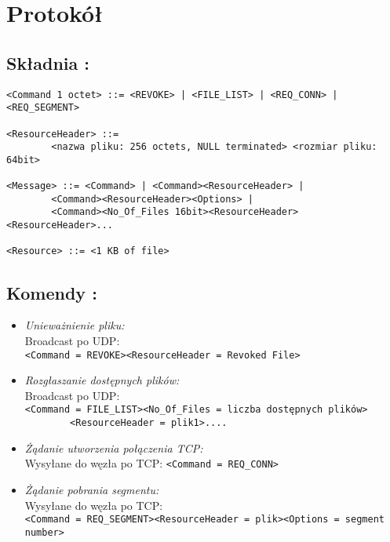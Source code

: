 \documentclass[11pt,oneside]{book}
\newcommand{\+}{\discretionary{\mbox{\scriptsize$\hookleftarrow$}}{}{}}
\begin{document}
\chapter{Protokół}
\section{Składnia :}
\begin{verbatim}
<Command 1 octet> ::= <REVOKE> | <FILE_LIST> | <REQ_CONN> | <REQ_SEGMENT> 

<ResourceHeader> ::= 
        <nazwa pliku: 256 octets, NULL terminated> <rozmiar pliku: 64bit>

<Message> ::= <Command> | <Command><ResourceHeader> | 
        <Command><ResourceHeader><Options> | 
        <Command><No_Of_Files 16bit><ResourceHeader><ResourceHeader>...

<Resource> ::= <1 KB of file>
\end{verbatim}
\section{Komendy :}
\begin{itemize}
\item
\textsl{Unieważnienie pliku:}\\
Broadcast po UDP: \\ \verb|<Command = REVOKE><ResourceHeader = Revoked File>|
\item
\textsl{Rozgłaszanie dostępnych plików:}\\
Broadcast po UDP: \\ \verb|<Command = FILE_LIST><No_Of_Files = liczba dostępnych plików>| \\
\verb|        <ResourceHeader = plik1>....|
\item
\textsl{Żądanie utworzenia połączenia TCP:}\\
Wysyłane do węzła po TCP: \verb|<Command = REQ_CONN>|
\item
\textsl{Żądanie pobrania segmentu:}\\
Wysyłane do węzła po TCP: \\ \verb|<Command = REQ_SEGMENT><ResourceHeader = plik><Options = segment number>|
\end{itemize}
\end{document}
